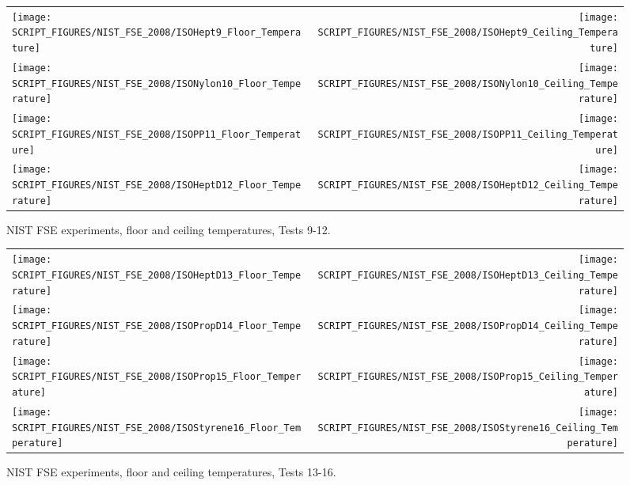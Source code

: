 \begin{figure}[p]
\begin{tabular*}{\textwidth}{l@{\extracolsep{\fill}}r}
\texttt{[image: SCRIPT\_FIGURES/NIST\_FSE\_2008/ISOHept9\_Floor\_Temperature]} &
\texttt{[image: SCRIPT\_FIGURES/NIST\_FSE\_2008/ISOHept9\_Ceiling\_Temperature]} \\
\texttt{[image: SCRIPT\_FIGURES/NIST\_FSE\_2008/ISONylon10\_Floor\_Temperature]} &
\texttt{[image: SCRIPT\_FIGURES/NIST\_FSE\_2008/ISONylon10\_Ceiling\_Temperature]} \\
\texttt{[image: SCRIPT\_FIGURES/NIST\_FSE\_2008/ISOPP11\_Floor\_Temperature]} &
\texttt{[image: SCRIPT\_FIGURES/NIST\_FSE\_2008/ISOPP11\_Ceiling\_Temperature]} \\
\texttt{[image: SCRIPT\_FIGURES/NIST\_FSE\_2008/ISOHeptD12\_Floor\_Temperature]} &
\texttt{[image: SCRIPT\_FIGURES/NIST\_FSE\_2008/ISOHeptD12\_Ceiling\_Temperature]}
\end{tabular*}
\caption{NIST FSE experiments, floor and ceiling temperatures, Tests 9-12.}
\label{NIST_FSE_2008_Surface_Temp_2}
\end{figure}

\begin{figure}[p]
\begin{tabular*}{\textwidth}{l@{\extracolsep{\fill}}r}
\texttt{[image: SCRIPT\_FIGURES/NIST\_FSE\_2008/ISOHeptD13\_Floor\_Temperature]} &
\texttt{[image: SCRIPT\_FIGURES/NIST\_FSE\_2008/ISOHeptD13\_Ceiling\_Temperature]} \\
\texttt{[image: SCRIPT\_FIGURES/NIST\_FSE\_2008/ISOPropD14\_Floor\_Temperature]} &
\texttt{[image: SCRIPT\_FIGURES/NIST\_FSE\_2008/ISOPropD14\_Ceiling\_Temperature]} \\
\texttt{[image: SCRIPT\_FIGURES/NIST\_FSE\_2008/ISOProp15\_Floor\_Temperature]} &
\texttt{[image: SCRIPT\_FIGURES/NIST\_FSE\_2008/ISOProp15\_Ceiling\_Temperature]} \\
\texttt{[image: SCRIPT\_FIGURES/NIST\_FSE\_2008/ISOStyrene16\_Floor\_Temperature]} &
\texttt{[image: SCRIPT\_FIGURES/NIST\_FSE\_2008/ISOStyrene16\_Ceiling\_Temperature]}
\end{tabular*}
\caption{NIST FSE experiments, floor and ceiling temperatures, Tests 13-16.}
\label{NIST_FSE_2008_Surface_Temp_3}
\end{figure}

